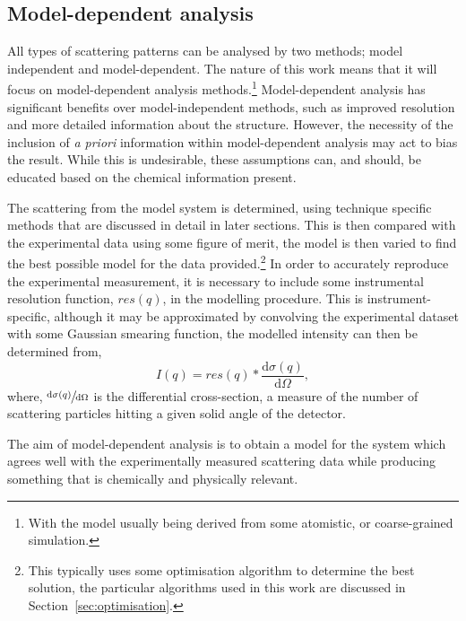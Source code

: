 \subsection{Model-dependent analysis}
\label{sec:moddep}
All types of scattering patterns can be analysed by two methods; model independent and model-dependent.
The nature of this work means that it will focus on model-dependent analysis methods.\footnote{With the model usually being derived from some atomistic, or coarse-grained simulation.}
Model-dependent analysis has significant benefits over model-independent methods, such as improved resolution and more detailed information about the structure.
However, the necessity of the inclusion of \emph{a priori} information within model-dependent analysis may act to bias the result.
While this is undesirable, these assumptions can, and should, be educated based on the chemical information present.\autocite[][such as the propensity for twin-tailed phospholipid molecules to form monolayers at an air-water interface or small surfactants to form micelles in solution.]{mccluskey_model-dependent_2018}

The scattering from the model system is determined, using technique specific methods that are discussed in detail in later sections.
This is then compared with the experimental data using some figure of merit, the model is then varied to find the best possible model for the data provided.\footnote{This typically uses some optimisation algorithm to determine the best solution, the particular algorithms used in this work are discussed in Section~\ref{sec:optimisation}.}
In order to accurately reproduce the experimental measurement, it is necessary to include some instrumental resolution function, $res(q)$, in the modelling procedure.
This is instrument-specific, although it may be approximated by convolving the experimental dataset with some Gaussian smearing function, the modelled intensity can then be determined from,\autocite{nelson_towards_2013-1,nelson_towards_2014}
%
\begin{equation}
    I(q) = res(q) * \frac{\text{d}\sigma(q)}{\text{d}\Omega},
\end{equation}
%
where, $\sfrac{\text{d}\sigma(q)}{\text{d}\Omega}$ is the differential cross-section, a measure of the number of scattering particles hitting a given solid angle of the detector.

The aim of model-dependent analysis is to obtain a model for the system which agrees well with the experimentally measured scattering data while producing something that is chemically and physically relevant.

